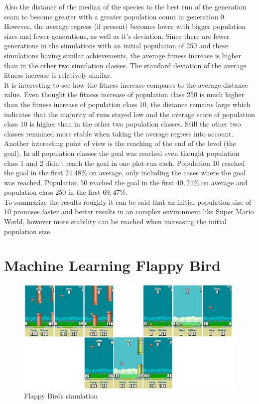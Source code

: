 			Also the distance of the median of the species to the best run of the generation seam to become greater with a greater population count in generation 0. However, the average regress (if present) becomes lower with bigger population sizes and fewer generations, as well as it's deviation. Since there are fewer generations in the simulations with an initial population of 250 and these simulations having similar achievements, the average fitness increase is higher than in the other two simulation classes. The standard deviation of the average fitness increase is relatively similar.\\
			It is interesting to see how the fitness increase compares to the average distance value. Even thought the fitness increase of population class 250 is much higher than the fitness increase of population class 10, the distance remains largs which indicates that the majority of runs stayed low and the average score of population class 10 is higher than in the other two population classes. Still the other two classes remained more stable when taking the average regress into account. \\
			Another interesting point of view is the reaching of the end of the level (the goal). In all population classes the goal was reached even thought population class 1 and 2 didn't reach the goal in one plot-run each. Population 10 reached the goal in the first $24.48\%$ on average, only including the cases where the goal was reached. Population 50 reached the goal in the first $40,24\%$ on average and population class 250 in the first $69,47\%$.\\
			To summarize the results roughly it can be said that an initial population size of 10 promises faster and better results in an complex environment like Super Mario World, however more stability can be reached when increasing the initial population size.
		
	
	\section{Machine Learning Flappy Bird}
		\label{sec:analysis:flappy}
		
		\begin{figure}[h]
			\centering
			\includegraphics[width=1\textwidth]{graphics/flappy/flappy_sim_s1}
			\caption{Flappy Birds simulation}
			\label{fig:flappy}
		\end{figure}
		
